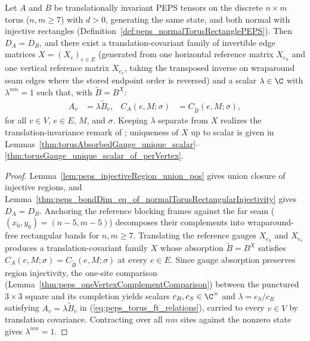 \begin{corollary}%
    \label{thm:fundamentalTheorem_normalTorusPEPS_unconditional}
    \leanok
    Let $A$ and $B$ be translationally invariant PEPS tensors on the discrete
    $n\times m$ torus ($n,m\ge 7$) with $d>0$, generating the same state, and
    both normal with injective rectangles
    (Definition~\ref{def:peps_normalTorusRectanglePEPS}). Then $D_A=D_B$, and
    there exist a translation-covariant family of invertible edge matrices
    $X=(X_e)_{e\in E}$ (generated from one horizontal reference matrix
    $X_{e_h}$ and one vertical reference matrix $X_{e_v}$, taking the
    transposed inverse on wraparound seam edges where the stored endpoint order
    is reversed) and a scalar $\lambda\in\C$ with $\lambda^{nm}=1$ such that,
    with $\widetilde B=B^X$:
    \begin{align}
        A_v             & =\lambda\widetilde B_v,
                        &
        C_A(e,M;\sigma) & =C_{\widetilde B}(e,M;\sigma),
        \label{eq:peps_torus_ft_relations}
    \end{align}
    for all $v\in V$, $e\in E$, $M$, and $\sigma$.
    Keeping $\lambda$ separate from $X$ realizes the translation-invariance
    remark of \cite[Section~4]{Molnar2018NormalPEPS}; uniqueness of $X$ up to
    scalar is given in
    Lemmas~\ref{thm:torusAbsorbedGauge_unique_scalar}--\ref{thm:torusGauge_unique_scalar_of_perVertex}.
    \begin{proof}
        \leanok
        Lemma~\ref{lem:peps_injectiveRegion_union_pos} gives union closure of
        injective regions, and
        Lemma~\ref{thm:peps_bondDim_eq_of_normalTorusRectangularInjectivity}
        gives $D_A=D_B$. Anchoring the reference blocking frames against the
        far seam ($(x_0,y_0)=(n-5,m-5)$) decomposes their complements into
        wraparound-free rectangular bands for $n,m\ge 7$. Translating the
        reference gauges $X_{e_h}$ and $X_{e_v}$ produces a
        translation-covariant family $X$ whose absorption $\widetilde B=B^X$
        satisfies $C_A(e,M;\sigma)=C_{\widetilde B}(e,M;\sigma)$ at every
        $e\in E$. Since gauge absorption preserves region injectivity, the
        one-site comparison (Lemma~\ref{thm:peps_oneVertexComplementComparison})
        between the punctured $3\times 3$ square and its completion yields
        scalars $c_R,c_S\in\C^\times$ and $\lambda=c_S/c_R$ satisfying
        $A_v=\lambda\widetilde B_v$ in (\ref{eq:peps_torus_ft_relations}),
        carried to every $v\in V$ by translation covariance. Contracting over
        all $nm$ sites against the nonzero state gives $\lambda^{nm}=1$.
    \end{proof}
\end{corollary}

